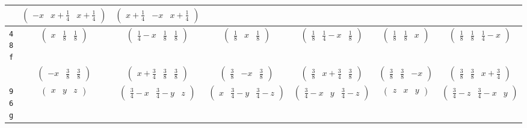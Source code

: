 \documentclass[fleqn,9pt,landscape]{jsarticle}
\begin{document}
\begin{center}
\begin{longtable}{ccccccc}
& $ \begin{pmatrix} - x & x + \frac{1}{4} & x + \frac{1}{4} \end{pmatrix} $ & $ \begin{pmatrix} x + \frac{1}{4} & - x & x + \frac{1}{4} \end{pmatrix} $ & $  $ & $  $ & $  $ & $  $ \\ \hline
{\tt 48f} & $ \begin{pmatrix} x & \frac{1}{8} & \frac{1}{8} \end{pmatrix} $ & $ \begin{pmatrix} \frac{1}{4} - x & \frac{1}{8} & \frac{1}{8} \end{pmatrix} $ & $ \begin{pmatrix} \frac{1}{8} & x & \frac{1}{8} \end{pmatrix} $ & $ \begin{pmatrix} \frac{1}{8} & \frac{1}{4} - x & \frac{1}{8} \end{pmatrix} $ & $ \begin{pmatrix} \frac{1}{8} & \frac{1}{8} & x \end{pmatrix} $ & $ \begin{pmatrix} \frac{1}{8} & \frac{1}{8} & \frac{1}{4} - x \end{pmatrix} $ \\
& $ \begin{pmatrix} - x & \frac{3}{8} & \frac{3}{8} \end{pmatrix} $ & $ \begin{pmatrix} x + \frac{3}{4} & \frac{3}{8} & \frac{3}{8} \end{pmatrix} $ & $ \begin{pmatrix} \frac{3}{8} & - x & \frac{3}{8} \end{pmatrix} $ & $ \begin{pmatrix} \frac{3}{8} & x + \frac{3}{4} & \frac{3}{8} \end{pmatrix} $ & $ \begin{pmatrix} \frac{3}{8} & \frac{3}{8} & - x \end{pmatrix} $ & $ \begin{pmatrix} \frac{3}{8} & \frac{3}{8} & x + \frac{3}{4} \end{pmatrix} $ \\ \hline
{\tt 96g} & $ \begin{pmatrix} x & y & z \end{pmatrix} $ & $ \begin{pmatrix} \frac{3}{4} - x & \frac{3}{4} - y & z \end{pmatrix} $ & $ \begin{pmatrix} x & \frac{3}{4} - y & \frac{3}{4} - z \end{pmatrix} $ & $ \begin{pmatrix} \frac{3}{4} - x & y & \frac{3}{4} - z \end{pmatrix} $ & $ \begin{pmatrix} z & x & y \end{pmatrix} $ & $ \begin{pmatrix} \frac{3}{4} - z & \frac{3}{4} - x & y \end{pmatrix} $ \\

\end{longtable}
\end{center}
\end{document}
